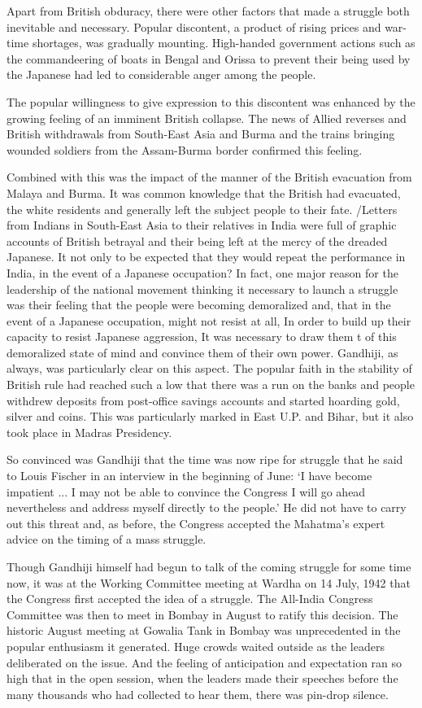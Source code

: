 Apart from British obduracy, there were other factors that made a struggle both inevitable and necessary. Popular discontent, a product of rising prices and war-time shortages, was gradually mounting. High-handed government actions such as the commandeering of boats in Bengal and Orissa to prevent their being used by the Japanese had led to considerable anger among the people.

The popular willingness to give expression to this discontent was enhanced by the growing feeling of an imminent British collapse. The news of Allied reverses and British withdrawals from South-East Asia and Burma and the trains bringing wounded soldiers from the Assam-Burma border confirmed this feeling.

Combined with this was the impact of the manner of the British evacuation from Malaya and Burma. It was common knowledge that the British had evacuated, the white residents and generally left the subject people to their fate. /Letters from Indians in South-East Asia to their relatives in India were full of graphic accounts of British betrayal and their being left at the mercy of the dreaded Japanese. It not only to be expected that they would repeat the performance in India, in the event of a Japanese occupation? In fact, one major reason for the leadership of the national movement thinking it necessary to launch a struggle was their feeling that the people were becoming demoralized and, that in the event of a Japanese occupation, might not resist at all, In order to build up their capacity to resist Japanese aggression, It was necessary to draw them t of this demoralized state of mind and convince them of their own power. Gandhiji, as always, was particularly clear on this aspect. The popular faith in the stability of British rule had reached such a low that there was a run on the banks and people withdrew deposits from post-office savings accounts and started hoarding gold, silver and coins. This was particularly marked in East U.P. and Bihar, but it also took place in Madras Presidency.

So convinced was Gandhiji that the time was now ripe for struggle that he said to Louis Fischer in an interview in the beginning of June: `I have become impatient ... I may not be able to convince the Congress I will go ahead nevertheless and address myself directly to the people.' He did not have to carry out this threat and, as before, the Congress accepted the Mahatma's expert advice on the timing of a mass struggle.

Though Gandhiji himself had begun to talk of the coming struggle for some time now, it was at the Working Committee meeting at Wardha on 14 July, 1942 that the Congress first accepted the idea of a struggle. The All-India Congress Committee was then to meet in Bombay in August to ratify this decision. The historic August meeting at Gowalia Tank in Bombay was unprecedented in the popular enthusiasm it generated. Huge crowds waited outside as the leaders deliberated on the issue. And the feeling of anticipation and expectation ran so high that in the open session, when the leaders made their speeches before the many thousands who had collected to hear them, there was pin-drop silence.

